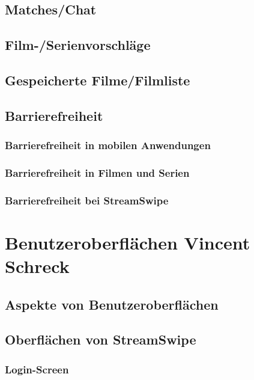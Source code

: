 \documentclass[11pt,a4paper]{article}
\begin{document}
\subsection{Matches/Chat}		
\subsection{Film-/Serienvorschläge}
\subsection{Gespeicherte Filme/Filmliste}		
\subsection{Barrierefreiheit}
\label{sec:barrierefreiheit}

\subsubsection{Barrierefreiheit in mobilen Anwendungen}

\subsubsection{Barrierefreiheit in Filmen und Serien}

\subsubsection{Barrierefreiheit bei StreamSwipe}
\label{sec:bf-streamswipe}

\clearpage

\section[Benutzeroberflächen]{Benutzeroberflächen \hfill \normalfont \small{Vincent Schreck}}

\subsection{Aspekte von Benutzeroberflächen}
\label{sec:UI-Aspekte}

\subsection{Oberflächen von StreamSwipe}

\subsubsection{Login-Screen}
\label{sec:loginscreen}

\end{document}
